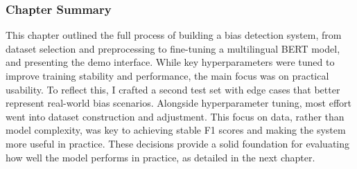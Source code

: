 \subsubsection{Chapter Summary}
This chapter outlined the full process of building a bias detection system, from dataset selection and preprocessing to fine-tuning a multilingual BERT model, and presenting the demo interface. While key hyperparameters were tuned to improve training stability and performance, the main focus was on practical usability. To reflect this, I crafted a second test set with edge cases that better represent real-world bias scenarios. Alongside hyperparameter tuning, most effort went into dataset construction and adjustment. This focus on data, rather than model complexity, was key to achieving stable F1 scores and making the system more useful in practice. These decisions provide a solid foundation for evaluating how well the model performs in practice, as detailed in the next chapter.